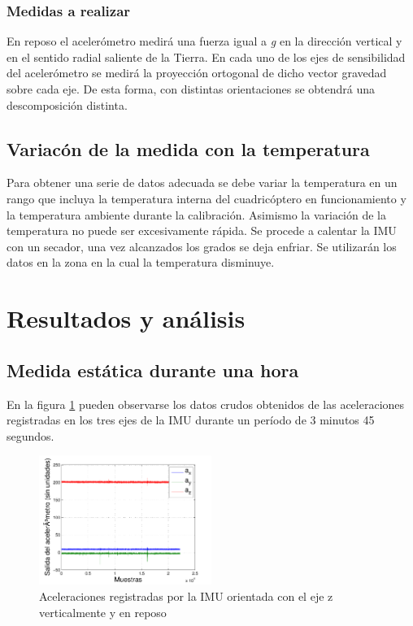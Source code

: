 \documentclass[main]{subfiles}
\begin{document}
\subsubsection*{Medidas a realizar}
En reposo el acelerómetro medirá una fuerza igual a \textit{g} en la dirección vertical y en el sentido radial saliente de la Tierra. En cada uno de los ejes de sensibilidad del acelerómetro se medirá la proyección ortogonal de dicho vector gravedad sobre cada eje. De esta forma, con distintas orientaciones se obtendrá una descomposición distinta.

\subsection{Variac\'on de la medida con la temperatura}
Para obtener una serie de datos adecuada se debe variar la temperatura en un rango que incluya la temperatura interna del cuadric\'optero en funcionamiento y la temperatura ambiente durante la calibraci\'on. Asimismo la variaci\'on de la temperatura no puede ser excesivamente r\'apida. Se procede a calentar la IMU con un secador, una vez alcanzados los %
grados se deja enfriar. Se utilizar\'an los datos en la zona en la cual la temperatura disminuye. 

\section{Resultados y análisis}
\subsection{Medida estática durante una hora}

En la figura \ref{fig:rrtests} pueden observarse los datos crudos obtenidos de las aceleraciones registradas en los tres ejes de la IMU durante un período de 3 minutos 45 segundos.

\begin{figure}[h!]
  \begin{center}
    \includegraphics[width=0.5\textwidth]{./pics_acc/rrtests.pdf}
  \end{center}
  \caption{Aceleraciones registradas por la IMU orientada con el eje z verticalmente y en reposo}
  \label{fig:rrtests}

\end{figure}
\end{document}
